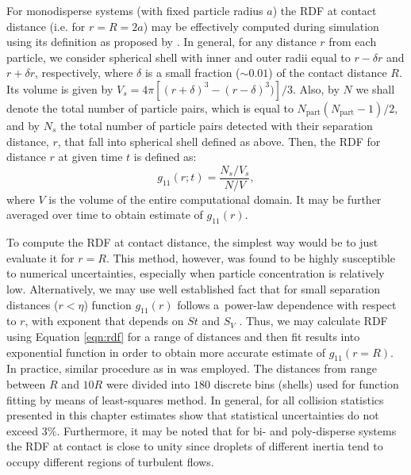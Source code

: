 \documentclass{pracamgren}
\begin{document}
For monodisperse systems (with fixed particle radius $a$) the RDF at contact distance (i.e. for $r = R = 2a$) may be effectively computed during simulation using its definition as proposed by \textcite{Wang2000,Zhou2001}.
In general, for any distance $r$ from each particle, we consider spherical shell with inner and outer radii equal to $r - \delta r$ and $r + \delta r$, respectively, where $\delta$ is a small fraction ($\sim 0.01$) of the contact distance $R$.
Its volume is given by $V_s = 4 \pi [(r + \delta)^3 - (r - \delta)^3)] / 3$.
Also, by $N$ we shall denote the total number of particle pairs, which is equal to $N_{\text{part}}(N_{\text{part}} - 1) / 2$, and by $N_s$ the total number of particle pairs detected with their separation distance, $r$, that fall into spherical shell defined as above.
Then, the RDF for distance $r$ at given time $t$ is defined as: 
\begin{equation}
g_{11}(r; t) = \frac{N_s / V_s}{N / V} ,
\label{eqn:rdf}
\end{equation}
where $V$ is the volume of the entire computational domain.
It may be further averaged over time to obtain estimate of $g_{11}(r)$.

To compute the RDF at contact distance, the simplest way would be to just evaluate it for ${r = R}$.
This method, however, was found to be highly susceptible to numerical uncertainties, especially when particle concentration is relatively low.
Alternatively, we may use well established fact that for small separation distances ($r < \eta$) function $g_{11}(r)$ follows a~power-law dependence with respect to $r$, with exponent that depends on $St$ and $S_V$ \parencite[Equation 11 therein]{Rosa2013}.
Thus, we may calculate RDF using Equation \ref{eqn:rdf} for a range of distances and then fit results into exponential function in order to obtain more accurate estimate of $g_{11}(r = R)$.
In practice, similar procedure as in \textcite{Rosa2013} was employed.
The distances from range between $R$ and $10R$ were divided into $180$ discrete bins (shells) used for function fitting by means of least-squares method.
In general, for all collision statistics presented in this chapter estimates show that statistical uncertainties do not exceed $3 \%$.
Furthermore, it may be noted that for bi- and poly-disperse systems the RDF at contact is close to unity since droplets of different inertia tend to occupy different regions of turbulent flows.
\end{document}
